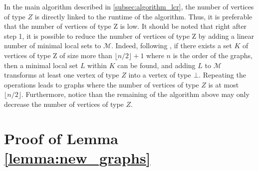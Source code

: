 \documentclass[a4paper,UKenglish,cleveref,autoref,thm-restate]{arxiv}
\begin{document}
\begin{remark}
    In the main algorithm described in \cref{subsec:algorithm_lcr}, the number of vertices of type $Z$ is directly linked to the runtime of the algorithm. Thus, it is preferable that the number of vertices of type Z is low. It should be noted that right after step 1, it is possible to reduce the number of vertices of type Z by adding a linear number of minimal local sets to $\mathcal M$. Indeed, following \cite{claudet2024local}, if there exists a set $K$ of vertices of type Z of size more than $\lfloor n/2 \rfloor +1$ where $n$ is the order of the graphs, then a minimal local set $L$ within $K$ can be found, and adding $L$ to $\mathcal M$ transforms at least one vertex of type $Z$ into a vertex of type $\bot$. Repeating the operations leads to graphs where the number of vertices of type $Z$ is at most $\lfloor n/2 \rfloor$. Furthermore, notice than the remaining of the algorithm above may only decrease the number of vertices of type $Z$.
\end{remark}

\section{Proof of Lemma \ref{lemma:new_graphs}} \label{app:new_graphs}

\newgraphs*
\end{document}

